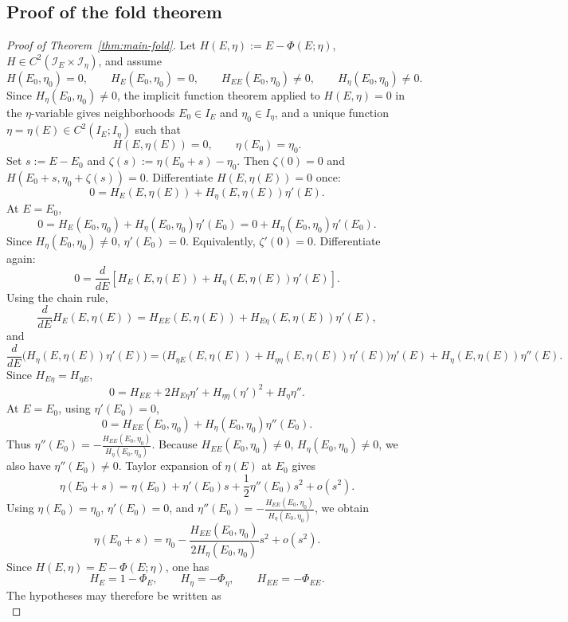 \documentclass[pdflatex,sn-mathphys-num]{sn-jnl}
\theoremstyle{thmstyleone}
\theoremstyle{definition}
\theoremstyle{remark}
\numberwithin{equation}{section}
\begin{document}
\subsection{Proof of the fold theorem}
\label{subsec:proof-fold}
\begin{proof}[Proof of Theorem~\ref{thm:main-fold}]
Let
$H(E,\eta):=E-\Phi(E;\eta)$,
$H\in C^2(\mathcal I_E\times\mathcal I_\eta)$,
and assume
\[
H(E_0,\eta_0)=0,
\qquad
H_E(E_0,\eta_0)=0,
\qquad
H_{EE}(E_0,\eta_0)\ne0,
\qquad
H_\eta(E_0,\eta_0)\ne0 .
\]
Since
$\displaystyle 
H_\eta(E_0,\eta_0)\ne0$,
the implicit function theorem applied to
$\displaystyle 
H(E,\eta)=0$
in the \(\eta\)-variable gives neighborhoods
$E_0\in I_E$ and $\eta_0\in I_\eta$,
and a unique function
$\displaystyle 
\eta=\eta(E)\in C^2(I_E;I_\eta)$
such that
\[
H(E,\eta(E))=0,
\qquad
\eta(E_0)=\eta_0.
\]
Set
$s:=E-E_0$ and
$\zeta(s):=\eta(E_0+s)-\eta_0$.
Then
$\zeta(0)=0$ and
$H(E_0+s,\eta_0+\zeta(s))=0$.
Differentiate \(H(E,\eta(E))=0\) once:
\[
0
=
H_E(E,\eta(E))+H_\eta(E,\eta(E))\eta'(E).
\]
At \(E=E_0\),
\[
0
=
H_E(E_0,\eta_0)+H_\eta(E_0,\eta_0)\eta'(E_0)
=
0+H_\eta(E_0,\eta_0)\eta'(E_0).
\]
Since \(H_\eta(E_0,\eta_0)\ne0\),
$\displaystyle 
\eta'(E_0)=0$.
Equivalently,
$\displaystyle 
\zeta'(0)=0$.
Differentiate again:
\[
0
=
\frac{d}{dE}
\left[
H_E(E,\eta(E))+H_\eta(E,\eta(E))\eta'(E)
\right].
\]
Using the chain rule,
\[
\frac{d}{dE}H_E(E,\eta(E))
=
H_{EE}(E,\eta(E))
+
H_{E\eta}(E,\eta(E))\eta'(E),
\]
and
\[
\frac{d}{dE}
\big(H_\eta(E,\eta(E))\eta'(E)\big)
=
\big(H_{\eta E}(E,\eta(E))
+
H_{\eta\eta}(E,\eta(E))\eta'(E)\big)\eta'(E)
+
H_\eta(E,\eta(E))\eta''(E).
\]
Since \(H_{E\eta}=H_{\eta E}\),
\[
0
=
H_{EE}
+
2H_{E\eta}\eta'
+
H_{\eta\eta}(\eta')^2
+
H_\eta\eta''.
\]
At \(E=E_0\), using \(\eta'(E_0)=0\),
\[
0
=
H_{EE}(E_0,\eta_0)
+
H_\eta(E_0,\eta_0)\eta''(E_0).
\]
Thus
$\displaystyle 
\eta''(E_0)
=
-\frac{H_{EE}(E_0,\eta_0)}{H_\eta(E_0,\eta_0)}$.
Because
$H_{EE}(E_0,\eta_0)\ne0$,
$H_\eta(E_0,\eta_0)\ne0$,
we also have
$\displaystyle 
\eta''(E_0)\ne0$.
Taylor expansion of \(\eta(E)\) at \(E_0\) gives
\[
\eta(E_0+s)
=
\eta(E_0)
+
\eta'(E_0)s
+
\frac12\eta''(E_0)s^2
+
o(s^2).
\]
Using
$\eta(E_0)=\eta_0$,
$\eta'(E_0)=0$, and
$\eta''(E_0)
=
-\frac{H_{EE}(E_0,\eta_0)}{H_\eta(E_0,\eta_0)}$,
we obtain
\[
\eta(E_0+s)
=
\eta_0
-
\frac{H_{EE}(E_0,\eta_0)}
     {2H_\eta(E_0,\eta_0)}
s^2
+
o(s^2).
\]
Since
$\displaystyle 
H(E,\eta)=E-\Phi(E;\eta)$,
one has
\[
H_E=1-\Phi_E,
\qquad
H_\eta=-\Phi_\eta,
\qquad
H_{EE}=-\Phi_{EE}.
\]
The hypotheses may therefore be written as
\[
\]
\end{proof}
\end{document}

